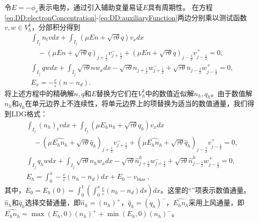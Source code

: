 令$E = -\phi_x$表示电势，通过引入辅助变量易证$E$具有周期性\cite{liu2010errorc}。
在方程\eqref{eq:DD:electronConcentration}-\eqref{eq:DD:auxiliaryFunction}两边分别乘以测试函数$v,w\in V_h^k$，分部积分得到
\begin{align}
     & \int_{I_{j}} n_{t} v d x+\int_{I_{j}}(\mu E n+\sqrt{\tau \theta} q) v_{x} d x                                                                               \nonumber                     \\
     & \quad-(\mu E n+\sqrt{\tau \theta} q)_{j+\frac{1}{2}} v_{j+\frac{1}{2}}^{-}+(\mu E n+\sqrt{\tau \theta} q)_{j-\frac{1}{2}} v_{j-\frac{1}{2}}^{+}=0,                                        \\
     & \int_{I_{j}} q w d x+\int_{I_{j}} \sqrt{\tau \theta} n w_{x} d x-\sqrt{\tau \theta} n_{j+\frac{1}{2}} w_{j+\frac{1}{2}}^{-}+\sqrt{\tau \theta} n_{j-\frac{1}{2}} w_{j-\frac{1}{2}}^{+}=0, \\
     & E_{x}=-\frac{e}{\varepsilon}\left(n-n_{d}\right) .
\end{align}
将上述方程中的精确解$n, q$和$E$替换为它们在$V_{h}^{k}$中的数值近似解$n_h, q_h$。由于数值解$n_h$和$q_h$在单元边界上不连续性，将单元边界上的项替换为适当的数值通量，我们得到LDG格式：
\begin{align}
     & \int_{I_{j}}\left(n_h\right)_{t} v d x+\int_{I_{j}}\left(\mu E_h n_h+\sqrt{\tau \theta} q_h\right) v_{x} d x      \nonumber                                                                                                                    \\
     & \quad-\left(\mu \widehat{E_h n_h}+\sqrt{\tau \theta} \hat{q}_{h}\right)_{j+\frac{1}{2}} v_{j+\frac{1}{2}}^{-}+\left(\mu \widehat{E_h n_h}+\sqrt{\tau \theta} \hat{q}_{h}\right)_{j-\frac{1}{2}} v_{j-\frac{1}{2}}^{+}=0, \label{eq:DDLDGn}     \\
     & \int_{I_{j}} q_h w d x+\int_{I_{j}} \sqrt{\tau \theta} n_h w_{x} d x-\sqrt{\tau \theta} \hat{n}_{j+\frac{1}{2}}^{h} w_{j+\frac{1}{2}}^{-}+\sqrt{\tau \theta} \hat{n}_{j-\frac{1}{2}}^{h} w_{j-\frac{1}{2}}^{+}=0,            \label{eq:DDLDGq} \\
     & E_h=\int_{0}^{x}-\frac{e}{\varepsilon}\left(n_h-n_{d}\right) d x+E_{0}-v_{\text {bias }},\label{eq:DDLDGE}
\end{align}
其中，$E_{0}=E_h(0)=\int_{0}^{1}\left(\int_{0}^{x} \frac{e}{\varepsilon}\left(n_h-n_{d}\right) d s\right) d x$。这里的“$\hat{}$”项表示数值通量。$\hat{n}_{h}$和$\hat{q}_{h}$选择交替通量，即$\hat{n}_{h}=\left(n_h\right)^{+}$，$\hat{q}_{h}=\left(q_h\right)^{-}$，$\widehat{E_h n_h}$采用上风通量，即$\widehat{E_h n_h}=\max \left(E_h, 0\right)\left(n_h\right)^{+}+\min \left(E_h, 0\right)\left(n_h\right)^{-}$。

